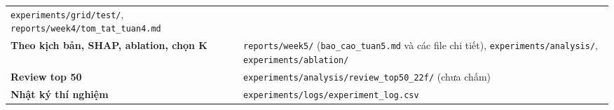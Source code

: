 \documentclass[
  11pt,
]{article}
\begin{document}
\begin{longtable}[]{@{}
  >{\raggedright\arraybackslash}p{}
  >{\raggedright\arraybackslash}p{}@{}}
\texttt{experiments/\allowbreak{}grid/\allowbreak{}test/\allowbreak{}},
\texttt{reports/\allowbreak{}week4/\allowbreak{}tom\_\allowbreak{}tat\_\allowbreak{}tuan4.\allowbreak{}md} \\
\textbf{Theo kịch bản, SHAP, ablation, chọn K} &
\texttt{reports/\allowbreak{}week5/\allowbreak{}}
(\texttt{bao\_\allowbreak{}cao\_\allowbreak{}tuan5.\allowbreak{}md} và
các file chi tiết),
\texttt{experiments/\allowbreak{}analysis/\allowbreak{}},
\texttt{experiments/\allowbreak{}ablation/\allowbreak{}} \\
\textbf{Review top 50} &
\texttt{experiments/\allowbreak{}analysis/\allowbreak{}review\_\allowbreak{}top50\_\allowbreak{}22f/\allowbreak{}}
(chưa chấm) \\
\textbf{Nhật ký thí nghiệm} &
\texttt{experiments/\allowbreak{}logs/\allowbreak{}experiment\_\allowbreak{}log.\allowbreak{}csv} \\
\end{longtable}
\end{document}
